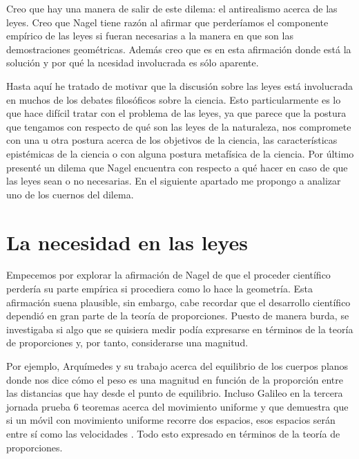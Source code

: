 Creo que hay una manera de salir de este dilema: el antirealismo acerca de las leyes. Creo que Nagel tiene razón al afirmar que perderíamos el componente empírico de las leyes si fueran necesarias a la manera en que son las demostraciones geométricas. Además creo que es en esta afirmación donde está la solución y por qué la ncesidad involucrada es sólo aparente.

Hasta aquí he tratado de motivar que la discusión sobre las leyes está involucrada en muchos de los debates filosóficos sobre la ciencia. Esto particularmente es lo que hace difícil tratar con el problema de las leyes, ya que parece que la postura que tengamos con respecto de qué son las leyes de la naturaleza, nos compromete con una u otra postura acerca de los objetivos de la ciencia, las características epistémicas de la ciencia o con alguna postura metafísica de la ciencia. Por último presenté un dilema que Nagel encuentra con respecto a qué hacer en caso de que las leyes sean o no necesarias. En el siguiente apartado me propongo a analizar uno de los cuernos del dilema.

\section{La necesidad en las leyes}

\noindent Empecemos por explorar la afirmación de Nagel de que el proceder científico perdería su parte empírica si procediera como lo hace la geometría. Esta afirmación suena plausible, sin embargo, cabe recordar que el desarrollo científico dependió en gran parte de la teoría de proporciones. Puesto de manera burda, se investigaba si algo que se quisiera medir podía expresarse en términos de la teoría de proporciones y, por tanto, considerarse una magnitud.

Por ejemplo, Arquímedes y su trabajo acerca del equilibrio de los cuerpos planos donde nos dice cómo el peso es una magnitud en función de la proporción entre las distancias que hay desde el punto de equilibrio. Incluso Galileo en la tercera jornada prueba 6 teoremas acerca del movimiento uniforme y que demuestra que si un móvil con movimiento uniforme recorre dos espacios, esos espacios serán entre sí como las velocidades \cite[p. 215]{galtre}. Todo esto expresado en términos de la teoría de proporciones.

